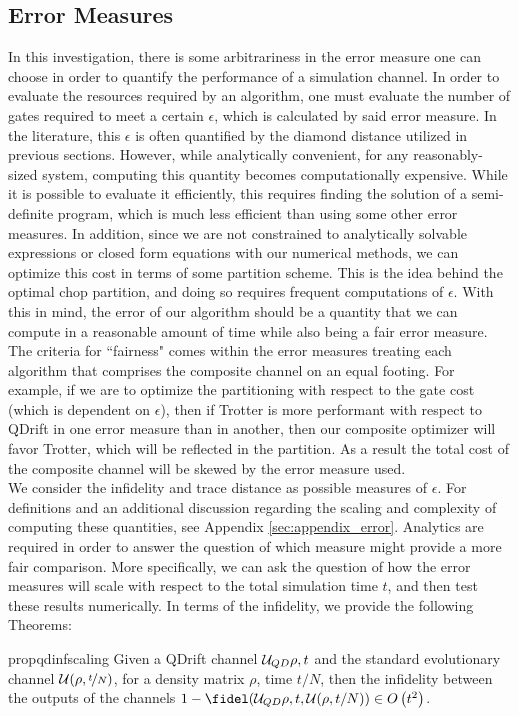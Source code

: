 \subsection{Error Measures} \label{sec:Error_Measure}
In this investigation, there is some arbitrariness in the error measure one can choose in order to quantify the performance of a simulation channel. In order to evaluate the resources required by an algorithm, one must evaluate the number of gates required to meet a certain $\epsilon$, which is calculated by said error measure. In the literature, this $\epsilon$ is often quantified by the diamond distance utilized in previous sections. However, while analytically convenient, for any reasonably-sized system, computing this quantity becomes computationally expensive. While it is possible to evaluate it efficiently, this requires finding the solution of a semi-definite program, which is much less efficient than using some other error measures. In addition, since we are not constrained to analytically solvable expressions or closed form equations with our numerical methods, we can optimize this cost in terms of some partition scheme. This is the idea behind the optimal chop partition, and doing so requires frequent computations of $\epsilon$. With this in mind, the error of our algorithm should be a quantity that we can compute in a reasonable amount of time while also being a fair error measure. The criteria for ``fairness" comes within the error measures treating each algorithm that comprises the composite channel on an equal footing. For example, if we are to optimize the partitioning with respect to the gate cost (which is dependent on $\epsilon$), then if Trotter is more performant with respect to QDrift in one error measure than in another, then our composite optimizer will favor Trotter, which will be reflected in the partition. As a result the total cost of the composite channel will be skewed by the error measure used. \\

We consider the infidelity and trace distance as possible measures of $\epsilon$. For definitions and an additional discussion regarding the scaling and complexity of computing these quantities, see Appendix \ref{sec:appendix_error}. Analytics are required in order to answer the question of which measure might provide a more fair comparison. More specifically, we can ask the question of how the error measures will scale with respect to the total simulation time $t$, and then test these results numerically. In terms of the infidelity, we provide the following Theorems:
\begin{restatable}{prop}{qdinfscaling} \label{thm:qdinfscaling}
    Given a QDrift channel $\mathcal{U}_{QD}{\rho, t}$ and the standard evolutionary channel $\mathcal{U}(\rho, \nicefrac{t}{N})$, for a density matrix $\rho$, time $t/N$, then the infidelity between the outputs of the channels $1- \fidel(\qdchan{\rho, t}, \capU(\rho, t/N)) \in \bigo{t^2}$.
 \end{restatable}

